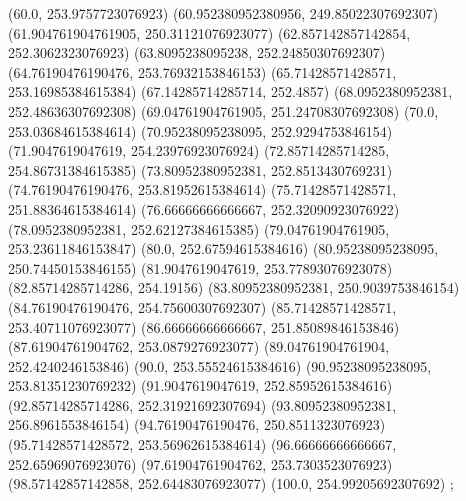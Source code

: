 {{{		(60.0, 253.9757723076923)
		(60.952380952380956, 249.85022307692307)
		(61.904761904761905, 250.31121076923077)
		(62.857142857142854, 252.3062323076923)
		(63.8095238095238, 252.24850307692307)
		(64.76190476190476, 253.76932153846153)
		(65.71428571428571, 253.16985384615384)
		(67.14285714285714, 252.4857)
		(68.0952380952381, 252.48636307692308)
		(69.04761904761905, 251.24708307692308)
		(70.0, 253.03684615384614)
		(70.95238095238095, 252.9294753846154)
		(71.9047619047619, 254.23976923076924)
		(72.85714285714285, 254.86731384615385)
		(73.80952380952381, 252.8513430769231)
		(74.76190476190476, 253.81952615384614)
		(75.71428571428571, 251.88364615384614)
		(76.66666666666667, 252.32090923076922)
		(78.0952380952381, 252.62127384615385)
		(79.04761904761905, 253.23611846153847)
		(80.0, 252.67594615384616)
		(80.95238095238095, 250.74450153846155)
		(81.9047619047619, 253.77893076923078)
		(82.85714285714286, 254.19156)
		(83.80952380952381, 250.9039753846154)
		(84.76190476190476, 254.75600307692307)
		(85.71428571428571, 253.40711076923077)
		(86.66666666666667, 251.85089846153846)
		(87.61904761904762, 253.0879276923077)
		(89.04761904761904, 252.4240246153846)
		(90.0, 253.55524615384616)
		(90.95238095238095, 253.81351230769232)
		(91.9047619047619, 252.85952615384616)
		(92.85714285714286, 252.31921692307694)
		(93.80952380952381, 256.8961553846154)
		(94.76190476190476, 250.8511323076923)
		(95.71428571428572, 253.56962615384614)
		(96.66666666666667, 252.65969076923076)
		(97.61904761904762, 253.7303523076923)
		(98.57142857142858, 252.64483076923077)
		(100.0, 254.99205692307692)
	};

}}
